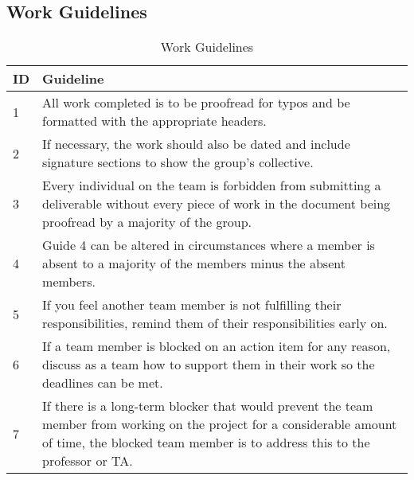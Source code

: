 \documentclass[12pt, titlepage]{article}
\begin{document}
\subsection*{Work Guidelines}
\begin{table}[H]
\caption{Work Guidelines}
\centering
\begin{tabular}{|l|p{12cm}|}
\hline
\textbf{ID} & \textbf{Guideline} \\ \hline
1 & All work completed is to be proofread for typos and be formatted with the appropriate headers. \\ \hline
2 & If necessary, the work should also be dated and include signature sections to show the group's collective. \\ \hline
3 & Every individual on the team is forbidden from submitting a deliverable without every piece of work in the document being proofread by a majority of the group. \\ \hline
4 & Guide 4 can be altered in circumstances where a member is absent to a majority of the members minus the absent members. \\ \hline
5 & If you feel another team member is not fulfilling their responsibilities, remind them of their responsibilities early on. \\ \hline
6 & If a team member is blocked on an action item for any reason, discuss as a team how to support them in their work so the deadlines can be met. \\ \hline
7 & If there is a long-term blocker that would prevent the team member from working on the project for a considerable amount of time, the blocked team member is to address this to the professor or TA. \\ \hline
\end{tabular}
\label{tab:work-guidelines}
\end{table}
\end{document}
